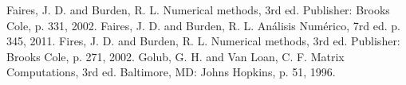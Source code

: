 

\begin{thebibliography}{1}
 Faires, J. D. and Burden, R. L. Numerical methods, 3rd ed. Publisher: Brooks Cole, p. 331, 2002.
Faires, J. D. and Burden, R. L. Análisis Numérico, 7rd ed. p. 345, 2011.
	 Fires, J. D. and Burden, R. L. Numerical methods, 3rd ed. Publisher: Brooks Cole, p. 271, 2002.
	 Golub, G. H. and Van Loan, C. F. Matrix Computations, 3rd ed. Baltimore, MD: Johns Hopkins, p. 51, 1996.
\end{thebibliography}
